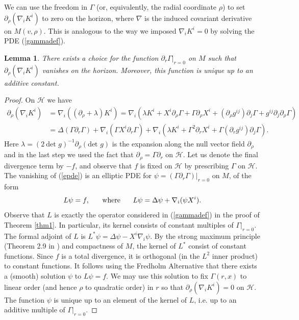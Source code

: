 \documentclass[11pt, reqno]{amsart}
\theoremstyle{plain}
\newtheorem{lemma}[theorem]{Lemma}
\theoremstyle{definition}
\numberwithin{equation}{section}
\begin{document}
We can use the freedom in $\Gamma$ (or, equivalently, the radial coordinate $\rho$) to set $\partial_\rho(\nabla_i K^i)$ to zero on the horizon, where $\nabla$ is the induced covariant derivative on $M(v,\rho)$. This is analogous to the way we imposed $\nabla_i K^i = 0$ by solving the PDE (\ref{gammadef}).
\begin{lemma} \label{lemel}
    There exists a choice for the function $\partial_r\Gamma\vert_{r = 0}$ on $M$ such that $\partial_\rho(\nabla_iK^i)$ vanishes on the horizon. Moreover, this function is unique up to an additive constant.
\end{lemma}
\begin{proof}
    On $\mathcal{H}$ we have
\begin{align}
    \partial_\rho(\nabla_i K^i) &= \nabla_i\left((\partial_\rho + \lambda)K^i\right) = \nabla_i\left(\lambda K^i + X^i\partial_\rho\Gamma + \Gamma\partial_\rho X^i + (\partial_\rho g^{ij})\partial_j\Gamma + g^{ij}\partial_j\partial_\rho\Gamma\right) \nonumber \\
    &= \Delta(\Gamma \partial_r\Gamma) + \nabla_i(\Gamma X^i\partial_r\Gamma) + \nabla_i\left(\lambda K^i + \Gamma^2\partial_rX^i + \Gamma(\partial_rg^{ij})\partial_j\Gamma\right). \label{epde}
\end{align}
Here $\lambda = (2\:\text{det }g)^{-1}\partial_\rho(\text{det }g)$ is the expansion along the null vector field $\partial_\rho$ and in the last step we used the fact that $\partial_\rho = \Gamma\partial_r$ on $\mathcal{H}$. Let us denote the final divergence term by $-f$, and observe that $f$ is fixed on $\mathcal{H}$ by prescribing $\Gamma$ on $\mathcal{H}$. The vanishing of (\ref{epde}) is an elliptic PDE for $\psi = (\Gamma\partial_r\Gamma)\vert_{r = 0}$ on $M$, of the form
    \begin{equation} \label{pder}
       L\psi = f, \hspace{.5cm}\text{ where }\hspace{.5cm} L \psi = \Delta \psi + \nabla_i(\psi X^i).
    \end{equation}
    Observe that $L$ is exactly the operator considered in (\ref{gammadef}) in the proof of Theorem \ref{thm1}. In particular, its kernel consists of constant multiples of $\Gamma\vert_{r = 0}$. The formal adjoint of $L$ is $L^*\psi = \Delta \psi - X^i\nabla_i\psi$. By the strong maximum principle (Theorem 2.9 in \cite{K93}) and compactness of $M$, the kernel of  $L^*$ consist of constant functions. Since $f$ is a total divergence, it is orthogonal (in the $L^2$ inner product) to constant functions. It follows using the Fredholm Alternative \cite[Theorem 2.4]{K93} that there exists a (smooth) solution $\psi$ to $L \psi = f$. We may use this solution to fix $\Gamma(r,x)$ to linear order (and hence $\rho$ to quadratic order) in $r$ so that $\partial_\rho(\nabla_i K^i) = 0$ on $\mathcal{H}$. The function $\psi$ is unique up to an element of the kernel of $L$, i.e. up to an additive multiple of $\Gamma\vert_{r = 0}$.
\end{proof}
\end{document}

